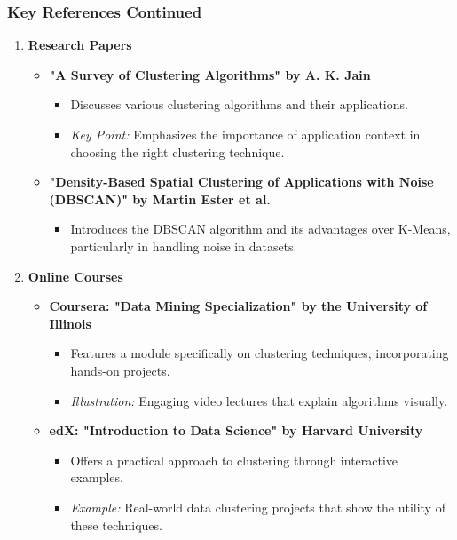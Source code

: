 \documentclass[aspectratio=169]{beamer}
\begin{document}
\begin{frame}[fragile]
    \frametitle{Key References Continued}
    \begin{enumerate}[resume]
        \item \textbf{Research Papers}
            \begin{itemize}
                \item \textbf{"A Survey of Clustering Algorithms" by A. K. Jain}
                    \begin{itemize}
                        \item Discusses various clustering algorithms and their applications.
                        \item \textit{Key Point:} Emphasizes the importance of application context in choosing the right clustering technique.
                    \end{itemize}
                \item \textbf{"Density-Based Spatial Clustering of Applications with Noise (DBSCAN)" by Martin Ester et al.}
                    \begin{itemize}
                        \item Introduces the DBSCAN algorithm and its advantages over K-Means, particularly in handling noise in datasets.
                    \end{itemize}
            \end{itemize}

        \item \textbf{Online Courses}
            \begin{itemize}
                \item \textbf{Coursera: "Data Mining Specialization" by the University of Illinois}
                    \begin{itemize}
                        \item Features a module specifically on clustering techniques, incorporating hands-on projects.
                        \item \textit{Illustration:} Engaging video lectures that explain algorithms visually.
                    \end{itemize}
                \item \textbf{edX: "Introduction to Data Science" by Harvard University}
                    \begin{itemize}
                        \item Offers a practical approach to clustering through interactive examples.
                        \item \textit{Example:} Real-world data clustering projects that show the utility of these techniques.
                    \end{itemize}
            \end{itemize}
    \end{enumerate}
\end{frame}
\end{document}
